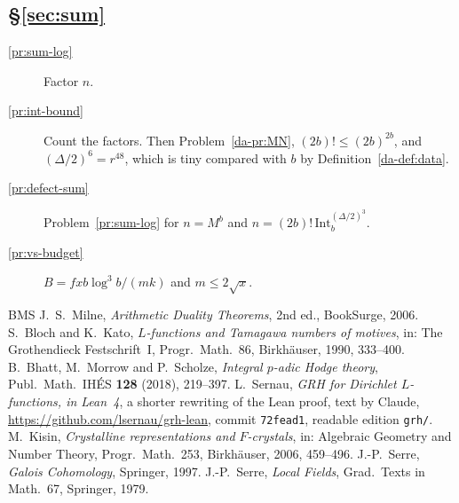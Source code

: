 \documentclass[reqno]{amsart}
\theoremstyle{definition}
\theoremstyle{plain}
\newcommand{\Int}{\mathrm{Int}}
\newcommand{\half}{(\Delta/2)}
\begin{document}
\subsection*{\S\ref{sec:sum}}
\begin{description}
\item[\ref{pr:sum-log}] Factor \(n\).
\item[\ref{pr:int-bound}] Count the factors.  Then Problem~\ref{da-pr:MN}, \((2b)! \le (2b)^{2b}\), and \(\half^6 = r^{48}\), which is tiny compared with \(b\) by Definition~\ref{da-def:data}.
\item[\ref{pr:defect-sum}] Problem~\ref{pr:sum-log} for \(n = M^b\) and \(n = (2b)!\,\Int_b^{\half^3}\).
\item[\ref{pr:vs-budget}] \(B = fxb\log^3b/(mk)\) and \(m \le 2\sqrt x\).
\end{description}

{\small
\begin{thebibliography}{BMS}
 J.~S.~Milne, \emph{Arithmetic Duality Theorems}, 2nd ed., BookSurge, 2006.
 S.~Bloch and K.~Kato, \emph{\(L\)-functions and Tamagawa numbers of motives}, in: The Grothendieck Festschrift~I, Progr.\ Math.\ 86, Birkh\"auser, 1990, 333--400.
 B.~Bhatt, M.~Morrow and P.~Scholze, \emph{Integral \(p\)-adic Hodge theory}, Publ.\ Math.\ IH\'ES \textbf{128} (2018), 219--397.
 L.~Sernau, \emph{GRH for Dirichlet \(L\)-functions, in Lean~4}, a shorter rewriting of the Lean proof, text by Claude, \url{https://github.com/lsernau/grh-lean}, commit \texttt{72fead1}, readable edition \texttt{grh/}.
 M.~Kisin, \emph{Crystalline representations and \(F\)-crystals}, in: Algebraic Geometry and Number Theory, Progr.\ Math.\ 253, Birkh\"auser, 2006, 459--496.
 J.-P.~Serre, \emph{Galois Cohomology}, Springer, 1997.
 J.-P.~Serre, \emph{Local Fields}, Grad.\ Texts in Math.\ 67, Springer, 1979.
\end{thebibliography}
}
\end{document}
